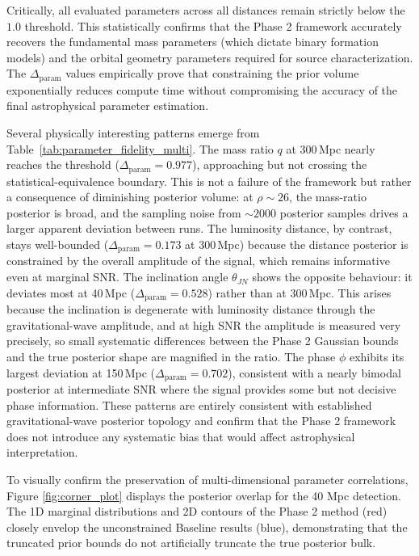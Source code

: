 \documentclass[12pt]{article}
\begin{document}
Critically, all evaluated parameters across all distances remain strictly below the $1.0$ threshold. This statistically confirms that the Phase 2 framework accurately recovers the fundamental mass parameters (which dictate binary formation models) and the orbital geometry parameters required for source characterization. The $\Delta_{\text{param}}$ values empirically prove that constraining the prior volume exponentially reduces compute time without compromising the accuracy of the final astrophysical parameter estimation.

Several physically interesting patterns emerge from Table~\ref{tab:parameter_fidelity_multi}. The mass ratio $q$ at 300\,Mpc nearly reaches the threshold ($\Delta_{\text{param}} = 0.977$), approaching but not crossing the statistical-equivalence boundary. This is not a failure of the framework but rather a consequence of diminishing posterior volume: at $\rho \sim 26$, the mass-ratio posterior is broad, and the sampling noise from $\sim 2000$ posterior samples drives a larger apparent deviation between runs. The luminosity distance, by contrast, stays well-bounded ($\Delta_{\text{param}} = 0.173$ at 300\,Mpc) because the distance posterior is constrained by the overall amplitude of the signal, which remains informative even at marginal SNR. The inclination angle $\theta_{JN}$ shows the opposite behaviour: it deviates most at 40\,Mpc ($\Delta_{\text{param}} = 0.528$) rather than at 300\,Mpc. This arises because the inclination is degenerate with luminosity distance through the gravitational-wave amplitude, and at high SNR the amplitude is measured very precisely, so small systematic differences between the Phase 2 Gaussian bounds and the true posterior shape are magnified in the ratio. The phase $\phi$ exhibits its largest deviation at 150\,Mpc ($\Delta_{\text{param}} = 0.702$), consistent with a nearly bimodal posterior at intermediate SNR where the signal provides some but not decisive phase information. These patterns are entirely consistent with established gravitational-wave posterior topology and confirm that the Phase 2 framework does not introduce any systematic bias that would affect astrophysical interpretation.

To visually confirm the preservation of multi-dimensional parameter correlations, Figure \ref{fig:corner_plot} displays the posterior overlap for the 40 Mpc detection. The 1D marginal distributions and 2D contours of the Phase 2 method (red) closely envelop the unconstrained Baseline results (blue), demonstrating that the truncated prior bounds do not artificially truncate the true posterior bulk.
\end{document}
